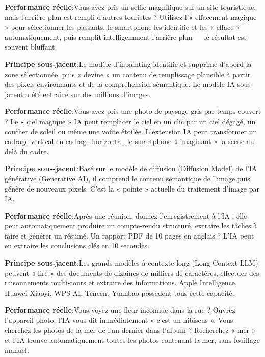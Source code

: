 \textbf{Performance réelle}:Vous avez pris un selfie magnifique sur un site touristique, mais l'arrière-plan est rempli d'autres touristes ? Utilisez l'« effacement magique » pour sélectionner les passants, le smartphone les identifie et les « efface » automatiquement, puis remplit intelligemment l'arrière-plan — le résultat est souvent bluffant.

\textbf{Principe sous-jacent}:Le modèle d'inpainting identifie et supprime d'abord la zone sélectionnée, puis « devine » un contenu de remplissage plausible à partir des pixels environnants et de la compréhension sémantique. Le modèle IA sous-jacent a été entraîné sur des millions d'images.


\textbf{Performance réelle}:Vous avez pris une photo de paysage gris par temps couvert ? Le « ciel magique » IA peut remplacer le ciel en un clic par un ciel dégagé, un coucher de soleil ou même une voûte étoilée. L'extension IA peut transformer un cadrage vertical en cadrage horizontal, le smartphone « imaginant » la scène au-delà du cadre.

\textbf{Principe sous-jacent}:Basé sur le modèle de diffusion (Diffusion Model) de l'IA générative (Generative AI), il comprend le contenu sémantique de l'image puis génère de nouveaux pixels. C'est la « pointe » actuelle du traitement d'image par IA.


\textbf{Performance réelle}:Après une réunion, donnez l'enregistrement à l'IA : elle peut automatiquement produire un compte-rendu structuré, extraire les tâches à faire et générer un résumé. Un rapport PDF de 10 pages en anglais ? L'IA peut en extraire les conclusions clés en 10 secondes.

\textbf{Principe sous-jacent}:Les grands modèles à contexte long (Long Context LLM) peuvent « lire » des documents de dizaines de milliers de caractères, effectuer des raisonnements multi-tours et extraire des informations. Apple Intelligence, Huawei Xiaoyi, WPS AI, Tencent Yuanbao possèdent tous cette capacité.


\textbf{Performance réelle}:Vous voyez une fleur inconnue dans la rue ? Ouvrez l’appareil photo, l’IA vous dit immédiatement « c’est un hibiscus ». Vous cherchez les photos de la mer de l’an dernier dans l’album ? Recherchez « mer » et l’IA trouve automatiquement toutes les photos contenant la mer, sans fouillage manuel.

